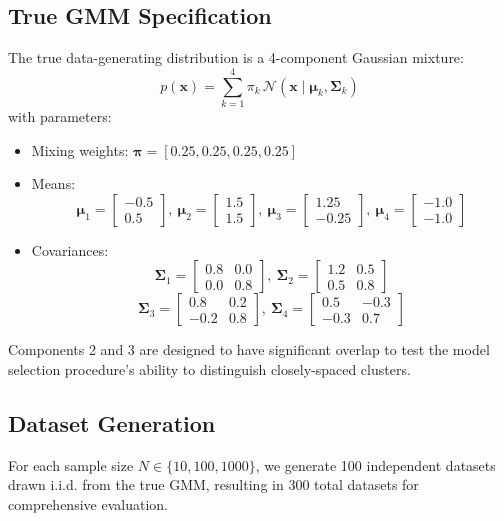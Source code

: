 \documentclass[12pt]{article}
\begin{document}
\subsection{True GMM Specification}
The true data-generating distribution is a 4-component Gaussian mixture:
\[
p(\mathbf{x}) = \sum_{k=1}^{4} \pi_k \,\mathcal{N}(\mathbf{x}\mid\boldsymbol{\mu}_k,\boldsymbol{\Sigma}_k)
\]
with parameters:
\begin{itemize}
    \item Mixing weights: $\boldsymbol{\pi} = [0.25, 0.25, 0.25, 0.25]$
    \item Means: 
    \[
    \boldsymbol{\mu}_1 = \begin{bmatrix}-0.5\\0.5\end{bmatrix},\ 
    \boldsymbol{\mu}_2 = \begin{bmatrix}1.5\\1.5\end{bmatrix},\ 
    \boldsymbol{\mu}_3 = \begin{bmatrix}1.25\\-0.25\end{bmatrix},\ 
    \boldsymbol{\mu}_4 = \begin{bmatrix}-1.0\\-1.0\end{bmatrix}
    \]
    \item Covariances:
    \[
    \boldsymbol{\Sigma}_1 = \begin{bmatrix}0.8 & 0.0\\ 0.0 & 0.8\end{bmatrix},\ 
    \boldsymbol{\Sigma}_2 = \begin{bmatrix}1.2 & 0.5\\ 0.5 & 0.8\end{bmatrix}
    \]
    \[
    \boldsymbol{\Sigma}_3 = \begin{bmatrix}0.8 & 0.2\\ -0.2 & 0.8\end{bmatrix},\ 
    \boldsymbol{\Sigma}_4 = \begin{bmatrix}0.5 & -0.3\\ -0.3 & 0.7\end{bmatrix}
    \]
\end{itemize}
Components 2 and 3 are designed to have significant overlap to test the model selection procedure's ability to distinguish closely-spaced clusters.

\subsection{Dataset Generation}
For each sample size $N \in \{10, 100, 1000\}$, we generate 100 independent datasets drawn i.i.d. from the true GMM, resulting in 300 total datasets for comprehensive evaluation.
\end{document}
